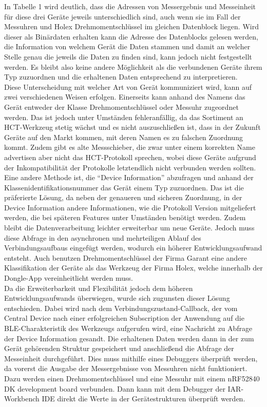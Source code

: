 In Tabelle 1 wird deutlich, dass die Adressen von Messergebnis und Messeinheit für diese drei Geräte jeweils unterschiedlich sind, auch wenn sie im Fall der Messuhren und Holex Drehmomentschlüssel im gleichen Datenblock liegen. Wird dieser als Binärdaten erhalten kann die Adresse des Datenblocks gelesen werden, die Information von welchem Gerät die Daten stammen und damit an welcher Stelle genau die jeweils die Daten zu finden sind, kann jedoch nicht festgestellt werden. Es bleibt also keine andere Möglichkeit als die verbundenen Geräte ihrem Typ zuzuordnen und die erhaltenen Daten entsprechend zu interpretieren.\\ 
Diese Unterscheidung mit welcher Art von Gerät kommuniziert wird, kann auf zwei verschiedenen Weisen erfolgen. Einerseits kann anhand des Namens das Gerät entweder der Klasse Drehmomentschlüssel oder Messuhr zugeordnet werden. Das ist jedoch unter Umständen fehleranfällig, da das Sortiment an \ac{HCT}-Werkzeug stetig wächst und es nicht auszuschließen ist, dass in der Zukunft Geräte auf den Markt kommen, mit deren Namen es zu falschen Zuordnung kommt. Zudem gibt es alte Messschieber, die zwar unter einem korrekten Name advertisen aber nicht das \ac{HCT}-Protokoll sprechen, wobei diese Geräte aufgrund der Inkompatibilität der Protokolle letztendlich nicht verbunden werden sollten.\\
Eine andere Methode ist, die ``Device Information'' abzufragen und anhand der Klassenidentifikationsnummer das Gerät einem Typ zuzuordnen. Das ist die präferierte Lösung, da neben der genaueren und sicheren Zuordnung, in der Device Information andere Informationen, wie die Protokoll Version mitgeliefert werden, die bei späteren Features unter Umständen benötigt werden. Zudem bleibt die Datenverarbeitung leichter erweiterbar um neue Geräte. Jedoch muss diese Abfrage in den asynchronen und mehrteiligen Ablauf des Verbindungsaufbaus eingefügt werden, wodurch ein höherer Entwicklungsaufwand entsteht. Auch benutzen Drehmomentschlüssel der Firma Garant eine andere Klassifikation der Geräte als das Werkzeug der Firma Holex, welche innerhalb der Dongle-App vereinheitlicht werden muss.\\
Da die Erweiterbarkeit und Flexibilität jedoch dem höheren Entwicklungsaufwands überwiegen, wurde sich zugunsten dieser Lösung entschieden. Dabei wird nach dem Verbindungszustand-Callback, der vom Central Device nach einer erfolgreichen Subscription der Anwendung auf die \ac{BLE}-Charakteristik des Werkzeugs aufgerufen wird, eine Nachricht zu Abfrage der Device Information gesandt. Die erhaltenen Daten werden dann in der zum Gerät gehörenden Struktur gespeichert und anschließend die Abfrage der Messeinheit durchgeführt. Dies muss mithilfe eines Debuggers überprüft werden, da vorerst die Ausgabe der Messergebnisse von Messuhren nicht funktioniert. Dazu werden einen Drehmomentschlüssel und eine Messuhr mit einem nRF52840 DK development board verbunden. Dann kann mit dem Debugger der IAR-Workbench \ac{IDE} direkt die Werte in der Gerätestrukturen überprüft werden.

